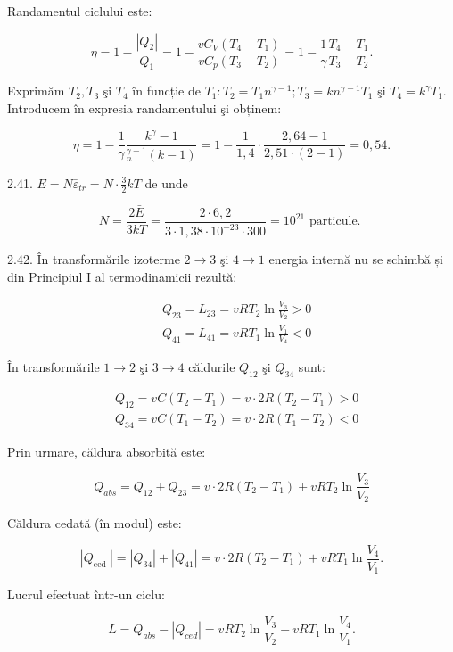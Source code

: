 \documentclass[10pt]{article}
\begin{document}
Randamentul ciclului este:

$$
\eta=1-\frac{\left|Q_{2}\right|}{Q_{1}}=1-\frac{v C_{V}\left(T_{4}-T_{1}\right)}{v C_{p}\left(T_{3}-T_{2}\right)}=1-\frac{1}{\gamma} \frac{T_{4}-T_{1}}{T_{3}-T_{2}} .
$$

Exprimăm $T_{2}, T_{3}$ şi $T_{4}$ în funcție de $T_{1}: T_{2}=T_{1} n^{\gamma-1} ; T_{3}=k n^{\gamma-1} T_{1}$ şi $T_{4}=k^{\gamma} T_{1}$. Introducem în expresia randamentului şi obținem:

$$
\eta=1-\frac{1}{\gamma} \frac{k^{\gamma}-1}{{ }_{n}^{\gamma-1}(k-1)}=1-\frac{1}{1,4} \cdot \frac{2,64-1}{2,51 \cdot(2-1)}=0,54 .
$$

2.41. $\bar{E}=N \bar{\varepsilon}_{t r}=N \cdot \frac{3}{2} k T$ de unde

$$
N=\frac{2 \bar{E}}{3 k T}=\frac{2 \cdot 6,2}{3 \cdot 1,38 \cdot 10^{-23} \cdot 300}=10^{21} \text { particule. }
$$

2.42. În transformările izoterme $2 \rightarrow 3$ şi $4 \rightarrow 1$ energia internă nu se schimbă și din Principiul I al termodinamicii rezultă:

$$
\begin{aligned}
& Q_{23}=L_{23}=v R T_{2} \ln \frac{V_{3}}{V_{2}}>0 \\
& Q_{41}=L_{41}=v R T_{1} \ln \frac{V_{1}}{V_{4}}<0
\end{aligned}
$$

În transformările $1 \rightarrow 2$ şi $3 \rightarrow 4$ căldurile $Q_{12}$ şi $Q_{34}$ sunt:

$$
\begin{aligned}
& Q_{12}=v C\left(T_{2}-T_{1}\right)=v \cdot 2 R\left(T_{2}-T_{1}\right)>0 \\
& Q_{34}=v C\left(T_{1}-T_{2}\right)=v \cdot 2 R\left(T_{1}-T_{2}\right)<0
\end{aligned}
$$

Prin urmare, căldura absorbită este:

$$
Q_{a b s}=Q_{12}+Q_{23}=v \cdot 2 R\left(T_{2}-T_{1}\right)+v R T_{2} \ln \frac{V_{3}}{V_{2}}
$$

Căldura cedată (în modul) este:

$$
\left|Q_{\text {ced }}\right|=\left|Q_{34}\right|+\left|Q_{41}\right|=v \cdot 2 R\left(T_{2}-T_{1}\right)+v R T_{1} \ln \frac{V_{4}}{V_{1}} .
$$

Lucrul efectuat într-un ciclu:

$$
L=Q_{a b s}-\left|Q_{c e d}\right|=v R T_{2} \ln \frac{V_{3}}{V_{2}}-v R T_{1} \ln \frac{V_{4}}{V_{1}} .
$$
\end{document}
